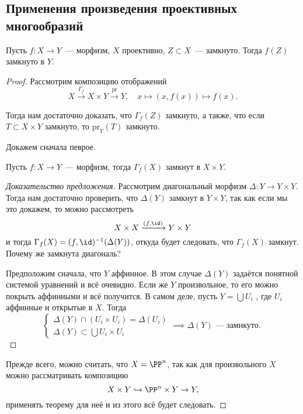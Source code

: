 		\subsection{Применения произведения проективных многообразий}

	\begin{theorem} 
		Пусть $f\colon X \to Y$~--- морфизм, $X$ проективно, $Z \subset X$~--- замкнуто. Тогда $f(Z)$ замкнуто в $Y$.
	\end{theorem}

	\begin{proof}
		Рассмотрим композицию отображений  
		\[
			X \xrightarrow{\Gamma_{f}} X \times Y \xrightarrow{\mathrm{pr}} Y, \quad x \mapsto (x, f(x)) \mapsto f(x).
		\]

		Тогда нам достаточно доказать, что  $\Gamma_{f}(Z)$ замкнуто, а также, что если $T \subset X \times Y$ замкнуто, то $\mathrm{pr}_{Y}(T)$ замкнуто. 

		Докажем сначала певрое. 

		\begin{statement} 
			Пусть $f\colon X \to Y$~--- морфизм, тогда $\Gamma_{f}(X)$ замкнут в $X \times Y$.
		\end{statement}
		\begin{proof}[Доказательство предложения]
			Рассмотрим диагональный морфизм $\Delta\colon Y \to Y \times Y$. Тогда нам достаточно проверить, что $\Delta(Y)$ замкнут в $Y \times Y$, так как если мы это докажем, то можно рассмотреть 
			\[
				X \times X \xrightarrow{(f, \id)} Y \times Y
			\]
			и тогда $\Gamma_{f}(X) = (f, \id)^{-1}(\Delta(Y))$, откуда будет следовать, что $\Gamma_{f}(X)$ замкнут. Почему же замкнута диагональ? 

			Предположим сначала, что $Y$ аффинное. В этом случае $\Delta(Y)$ задаётся понятной системой уравнений и всё очевидно. Если же $Y$ произвольное, то его можно покрыть аффинными и всё получится. В самом деле, пусть $Y = \bigcup U_{i}$ , где $U_i$ аффинные и открытые в $X$. Тогда 
			\[
				\begin{cases} \Delta(Y) \cap (U_i \times U_i) = \Delta(U_i) \\ \Delta(Y) \subset \bigcup U_i \times U_i \end{cases} \implies \Delta(Y) \text{~--- замнкуто. }
			\]

			
		\end{proof}
		
		Прежде всего, можно считать, что $X = \PP^n$, так как для произвольного $X$ можно рассматривать композицию
		\[
			X \times Y \hookrightarrow \PP^n \times Y \to Y, 
		\]
		применять теорему для неё и из этого всё будет следовать. 


\end{proof}
